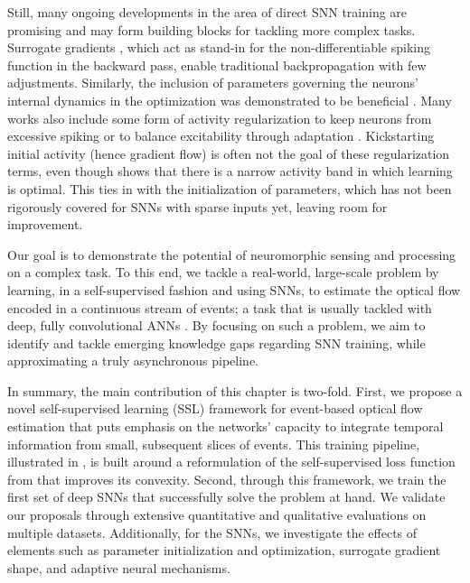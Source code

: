 Still, many ongoing developments in the area of direct SNN training are promising and may form building blocks for tackling more complex tasks. Surrogate gradients \cite{neftci2019surrogate,shrestha2018slayer,wu2018spatiotemporal,zenke2021remarkable}, which act as stand-in for the non-differentiable spiking function in the backward pass, enable traditional backpropagation with few adjustments. Similarly, the inclusion of parameters governing the neurons' internal dynamics in the optimization was demonstrated to be beneficial \cite{fang2021incorporating,perez-nieves2021neural}. Many works also include some form of activity regularization to keep neurons from excessive spiking \cite{bellec2020solution,zenke2021remarkable} or to balance excitability through adaptation \cite{bellec2018long,paredes-valles2020unsupervised}. Kickstarting initial activity (hence gradient flow) is often not the goal of these regularization terms, even though \cite{zenke2021remarkable} shows that there is a narrow activity band in which learning is optimal. This ties in with the initialization of parameters, which has not been rigorously covered for SNNs with sparse inputs yet, leaving room for improvement.

Our goal is to demonstrate the potential of neuromorphic sensing and processing on a complex task. To this end, we tackle a real-world, large-scale problem by learning, in a self-supervised fashion and using SNNs, to estimate the optical flow encoded in a continuous stream of events; a task that is usually tackled with deep, fully convolutional ANNs \cite{zhu2018evflownet, zhu2019unsupervised}. By focusing on such a problem, we aim to identify and tackle emerging knowledge gaps regarding SNN training, while approximating a truly asynchronous pipeline.

In summary, the main contribution of this chapter is two-fold. First, we propose a novel self-supervised learning (SSL) framework for event-based optical flow estimation that puts emphasis on the networks' capacity to integrate temporal information from small, subsequent slices of events. This training pipeline, illustrated in , is built around a reformulation of the self-supervised loss function from \cite{zhu2019unsupervised} that improves its convexity. Second, through this framework, we train the first set of deep SNNs that successfully solve the problem at hand. We validate our proposals through extensive quantitative and qualitative evaluations on multiple datasets. Additionally, for the SNNs, we investigate the effects of elements such as parameter initialization and optimization, surrogate gradient shape, and adaptive neural mechanisms.


